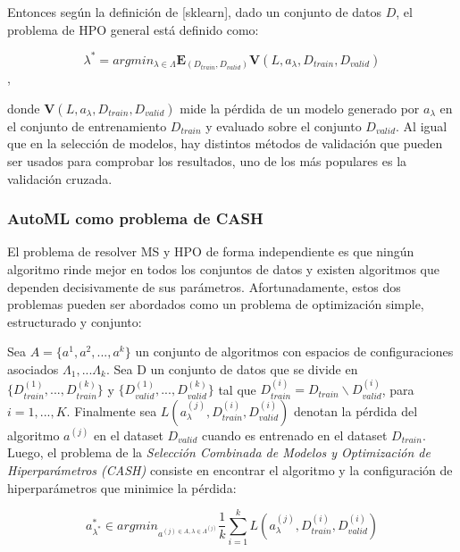 Entonces según la definición de [sklearn], dado un conjunto de datos $D$, el problema de HPO general está definido como:

\begin{equation}
	\lambda^* = argmin_{\lambda \in \Lambda}         \textbf{E}_{(D_{train}, D_{valid})}\textbf{V}(L, a_\lambda, D_{train}, D_{valid})
\end{equation},

donde $\textbf{V}(L, a_\lambda, D_{train}, D_{valid})$ mide la pérdida de un modelo generado por $a_\lambda$ en el conjunto de entrenamiento $D_{train}$ y evaluado sobre el conjunto $D_{valid}$. Al igual que en la selección de modelos, hay distintos métodos de validación que pueden ser usados para comprobar los resultados, uno de los más populares es la validación cruzada.

\subsubsection{AutoML como problema de CASH} 

El problema de resolver MS y HPO de forma independiente es que ningún algoritmo rinde mejor en todos los conjuntos de datos y existen algoritmos que dependen decisivamente de sus parámetros. Afortunadamente, estos dos problemas pueden ser abordados como un problema de optimización simple, estructurado y conjunto:

\begin{definition}
	Sea $A = \{a^1, a^2, ..., a^k\}$ un conjunto de algoritmos con espacios de configuraciones asociados $\Lambda_1, ... \Lambda_k$. Sea D un conjunto de datos que se divide en $\{D_{train}^{(1)}, ..., D_{train}^{(k)}\}$ y $\{D_{valid}^{(1)}, ..., D_{valid}^{(k)}\}$ tal que $D^{(i)}_{train} = D_{train}\backslash D_{valid}^{(i)}$, para $i=1,...,K$. Finalmente sea $L(a_\lambda^{(j)}, D_{train}^{(i)}, D_{valid}^{(i)})$ denotan la pérdida del algoritmo $a^{(j)}$ en el dataset $D_{valid}$ cuando es entrenado en el dataset $D_{train}$. Luego, el problema de la \textsl{Selección Combinada de Modelos y Optimización de Hiperparámetros (CASH)} consiste en encontrar el algoritmo y la configuración de hiperparámetros que minimice la pérdida:
	
	\begin{equation}\label{cash}
	 a^*_{\lambda^*} \in argmin_{a^{(j) \in A, \lambda \in \Lambda^{(j)}}} \dfrac{1}{k} \sum_{i=1}^{k} L\left(a_\lambda^{(j)}, D_{train}^{(i)}, D_{valid}^{(i)}\right)
	\end{equation}
\end{definition}   

